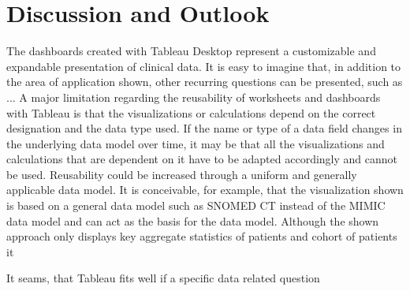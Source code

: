 \documentclass[aac,crcready]{iosart2x}
\begin{document}
\section{Discussion and Outlook}\label{s5}
The dashboards created with Tableau Desktop represent a customizable and expandable presentation of clinical data. It is easy to imagine that, in addition to the area of application shown, other recurring questions can be presented, such as ...
A major limitation regarding the reusability of worksheets and dashboards with Tableau is that the visualizations or calculations depend on the correct designation and the data type used. If the name or type of a data field changes in the underlying data model over time, it may be that all the visualizations and calculations that are dependent on it have to be adapted accordingly and cannot be used. Reusability could be increased through a uniform and generally applicable data model. It is conceivable, for example, that the visualization shown is based on a general data model such as SNOMED CT instead of the MIMIC data model and can act as the basis for the data model.
Although the shown approach only displays key aggregate statistics of patients and cohort of patients it 

It seams, that Tableau fits well if a specific data related question 




\end{document}
